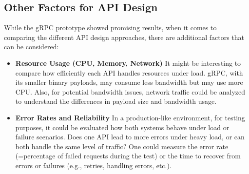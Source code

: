 \subsection{Other Factors for API Design}

While the \ac{gRPC} prototype showed promising results, when it comes to comparing the different \ac{API} design approaches, there are additional factors that can be considered:

\begin{itemize}
    \item \textbf{Resource Usage (CPU, Memory, Network)}
    It might be interesting to compare how efficiently each \ac{API} handles resources under load. \ac{gRPC}, with its smaller binary payloads, may consume less bandwidth but may use more CPU. 
    Also, for potential bandwidth issues, network traffic could be analyzed to understand the differences in payload size and bandwidth usage.
    
    \item \textbf{Error Rates and Reliability}
    In a production-like environment, for testing purposes, it could be evaluated how both systems behave under load or failure scenarios. Does one \ac{API} lead to more errors under heavy load, or can both handle the same level of traffic? One could measure the error rate (=percentage of failed requests during the test) or the time to recover from errors or failures (e.g., retries, handling errors, etc.).
\end{itemize}
